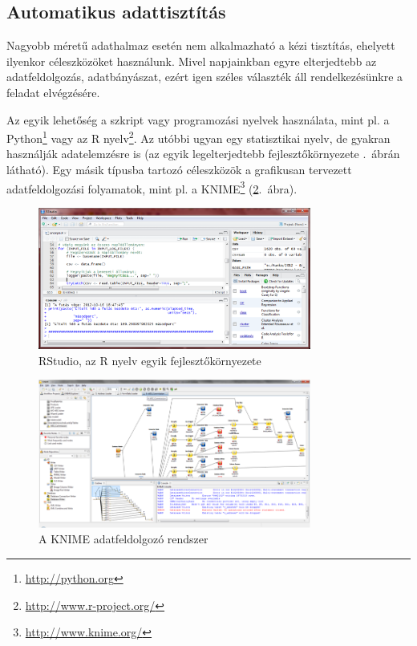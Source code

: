 \documentclass[a4paper,10pt,titlepage]{article}
\begin{document}
\subsection{Automatikus adattisztítás}

Nagyobb méretű adathalmaz esetén nem alkalmazható a kézi tisztítás, ehelyett ilyenkor céleszközöket használunk. Mivel napjainkban egyre elterjedtebb az adatfeldolgozás, adatbányászat, ezért igen széles választék áll rendelkezésünkre a feladat elvégzésére.

Az egyik lehetőség a szkript vagy programozási nyelvek használata, mint pl. a Python\footnote{\url{http://python.org}} vagy az R nyelv\footnote{\url{http://www.r-project.org/}}. Az utóbbi ugyan egy statisztikai nyelv, de gyakran használják adatelemzésre is (az egyik legelterjedtebb fejlesztőkörnyezete .~ábrán látható). Egy másik típusba tartozó céleszközök a grafikusan tervezett adatfeldolgozási folyamatok, mint pl. a KNIME\footnote{\url{http://www.knime.org/}} (\ref{fig:knime}.~ábra). 

\begin{figure}[h!]
\centering
\includegraphics[width=0.80\textwidth]{figures/RStudio.png}
\caption{RStudio, az R nyelv egyik fejlesztőkörnyezete \label{fig:RStudio}}
\end{figure}

\begin{figure}[h!]
\centering
\includegraphics[width=0.80\textwidth]{figures/knime.png}
\caption{A KNIME adatfeldolgozó rendszer \label{fig:knime}}
\end{figure}
\end{document}

